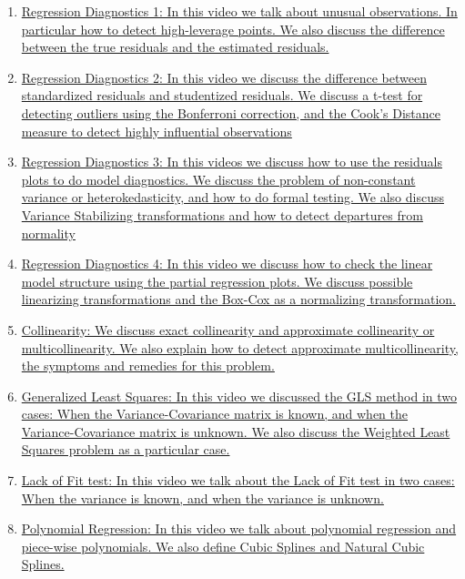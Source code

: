 \documentclass[11pt]{article}
\begin{document}
\begin{enumerate}
	\item \href{https://mp.weixin.qq.com/s/aAnAytJTkUK-PhfirlAdcg}{Regression Diagnostics 1: In this video we talk about unusual observations. In particular how to detect high-leverage points. We also discuss the difference between the true residuals and the estimated residuals.}	%
	\item \href{https://mp.weixin.qq.com/s/N3DIFzT7eOVbMt0uPQqLKA}{Regression Diagnostics 2: In this video we discuss the difference between standardized residuals and studentized residuals. We discuss a t-test for detecting outliers using the Bonferroni correction, and the Cook's Distance measure to detect highly influential observations}	%
	\item \href{https://mp.weixin.qq.com/s/psVaHQF9JyYyU5GsmBgnGw}{Regression Diagnostics 3: In this videos we discuss how to use the residuals plots to do model diagnostics. We discuss the problem of non-constant variance or heterokedasticity, and how to do formal testing. We also discuss Variance Stabilizing transformations and how to detect departures from normality}	%
	\item \href{https://mp.weixin.qq.com/s/U3Go8ScPAWUaslVAkkZRcQ}{Regression Diagnostics 4: In this video we discuss how to check the linear model structure using the partial regression plots. We discuss possible linearizing transformations and the Box-Cox as a normalizing transformation.}	%
	\item \href{https://mp.weixin.qq.com/s/VKRN-Zy7EBezRsIm0AIv-A}{Collinearity: We discuss exact collinearity and approximate collinearity  or multicollinearity. We also explain how to detect approximate multicollinearity, the symptoms and remedies for this problem.}	%
	\item \href{https://mp.weixin.qq.com/s/MUoc9VhuGCr8VI7PSox56w}{Generalized Least Squares: In this video we  discussed the GLS method in two cases: When the Variance-Covariance matrix is known, and  when the Variance-Covariance matrix is unknown. We also discuss the Weighted Least Squares problem as a particular case.}	%
	\item \href{https://mp.weixin.qq.com/s/vzhpRJTKTZ_4Ca7h3WfaXw}{Lack of Fit test: In this video we talk about the Lack of Fit test in two cases: When the variance is known, and when the variance is unknown.}	%
	\item \href{https://mp.weixin.qq.com/s/cuM4OouJhRi8lE-rF8sxTQ}{Polynomial Regression: In this video we talk about polynomial regression and piece-wise polynomials. We also define Cubic Splines and Natural Cubic Splines.}	%

\end{enumerate}
\end{document}
